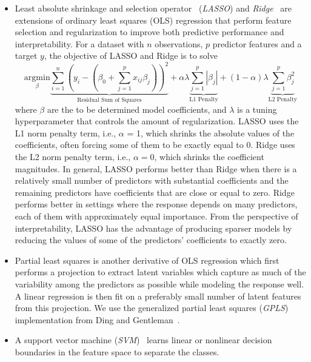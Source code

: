 \documentclass[
  oneside]{book}
\providecommand{\tightlist}{%
  \setlength{\itemsep}{0pt}\setlength{\parskip}{0pt}}
\begin{document}
\begin{itemize}
\tightlist
\item
  Least absolute shrinkage and selection operator~\autocite{lasso} (\emph{LASSO}) and \emph{Ridge}~\autocite{ridge} are extensions of ordinary least squares (OLS) regression that perform feature selection and regularization to improve both predictive performance and interpretability.
  For a dataset with \(n\) observations, \(p\) predictor features and a target \(y\), the objective of LASSO and Ridge is to solve
  \begin{equation}
  \underset{\beta}{\text{argmin}} \underbrace{\sum_{i=1}^n \left( y_i - \left( \beta_0 + \sum_{j=1}^p x_{ij}\beta_j \right) \right)^2}_{\text{Residual Sum of Squares}} + \alpha \lambda \underbrace{\sum_{j=1}^p |\beta_j|}_{\text{L1 Penalty}} + (1-\alpha) \lambda \underbrace{\sum_{j=1}^p \beta_j^2}_{\text{L2 Penalty}}
  \label{eq:regression-with-shrinkage}
  \end{equation}
  where \(\beta\) are the to be determined model coefficients, and \(\lambda\) is a tuning hyperparameter that controls the amount of regularization.
  LASSO uses the L1 norm penalty term, i.e., \(\alpha\) = 1, which shrinks the absolute values of the coefficients, often forcing some of them to be exactly equal to 0.
  Ridge uses the L2 norm penalty term, i.e., \(\alpha = 0\), which shrinks the coefficient magnitudes.
  In general, LASSO performs better than Ridge when there is a relatively small number of predictors with substantial coefficients and the remaining predictors have coefficients that are close or equal to zero.
  Ridge performs better in settings where the response depends on many predictors, each of them with approximately equal importance.
  From the perspective of interpretability, LASSO has the advantage of producing sparser models by reducing the values of some of the predictors' coefficients to exactly zero.
\item
  Partial least squares is another derivative of OLS regression which first performs a projection to extract latent variables which capture as much of the variability among the predictors as possible while modeling the response well.
  A linear regression is then fit on a preferably small number of latent features from this projection.
  We use the generalized partial least squares (\emph{GPLS}) implementation from Ding and Gentleman~\autocite{DingEtAl:GPLS2005}.
\item
  A support vector machine (\emph{SVM})~\autocite{Boser:SVM1992} learns linear or nonlinear decision boundaries in the feature space to separate the classes.

\end{itemize}
\end{document}
